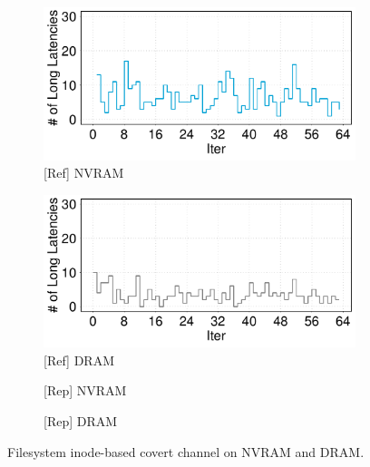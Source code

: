 
\begin{figure}[t]
    \centering

    \begin{subfigure}[b]{.48\linewidth}
        \centering
        \includegraphics[width=\linewidth]{figure/plot/reference/fig10a-covert-inode-pmem.tikz.pdf}
        \caption{[Ref] NVRAM}
        \label{fig:10:ref:covert-inode-nvram}
    \end{subfigure}
    \hfill
    \begin{subfigure}[b]{.48\linewidth}
        \centering
        \includegraphics[width=\linewidth]{figure/plot/reference/fig10b-covert-inode-dram.tikz.pdf}
        \caption{[Ref] DRAM}
        \label{fig:10:ref:covert-inode-dram}
    \end{subfigure}

    \hfill

    \begin{subfigure}[b]{.48\linewidth}
        \centering
        \caption{[Rep] NVRAM}
        \label{fig:10:rep:covert-inode-nvram}
    \end{subfigure}
    \hfill
    \begin{subfigure}[b]{.48\linewidth}
        \centering
        \caption{[Rep] DRAM}
        \label{fig:10:rep:covert-inode-dram}
    \end{subfigure}

    \caption{Filesystem inode-based covert channel on NVRAM and DRAM.}
    \label{fig:10:covert-inode}
\end{figure}
